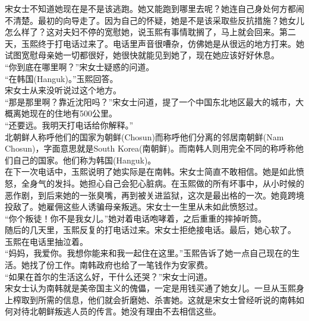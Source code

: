 宋女士不知道她现在是不是该逃跑。她又能跑到哪里去呢？她连自己身处何方都闹不清楚。最初的向导走了。因为自己的怀疑，她是不是该采取些反抗措施？她女儿怎么样了？这对夫妇不停的宽慰她，说玉熙有事情耽搁了，马上就会回来。第二天，玉熙终于打电话过来了。电话里声音很嘈杂，仿佛她是从很远的地方打来。她试图宽慰母亲她一切都很好，她很快就能见到她了，现在她应该好好休息。\\

“你到底在哪里啊？”宋女士疑惑的问道。\\

“在韩国(Hanguk)。”玉熙回答。\\

宋女士从来没听说过这个地方。\\

“那是那里啊？靠近沈阳吗？”宋女士问道，提了一个中国东北地区最大的城市，大概离她现在的住地有500公里。\\

“还要远。我明天打电话给你解释。”\\

北朝鲜人称呼他们的国家为朝鲜(Chosun)而称呼他们分离的邻居南朝鲜(Nam Chosun)，字面意思就是South Korea(南朝鲜)。而南韩人则用完全不同的称呼称他们自己的国家。他们称为韩国(Hanguk)。\\

在下一次电话中，玉熙说明了她实际是在南韩。宋女士简直不敢相信。她是如此愤怒，全身气的发抖。她担心自己会犯心脏病。在玉熙做的所有坏事中，从小时候的恶作剧，到后来她的一张臭嘴，再到被关进监狱，这次是最出格的一次。她竟跨境投敌了。她雇佣这些人诱骗母亲叛逃。宋女士一生里从未如此愤怒过。\\

“你个叛徒！你不是我女儿。”她对着电话咆哮着，之后重重的摔掉听筒。\\

随后的几天里，玉熙反复的打电话过来。宋女士拒绝接电话。最后，她心软了。\\

玉熙在电话里抽泣着。\\

“妈妈，我爱你。我想你能来和我一起住在这里。”玉熙告诉了她一点自己现在的生活。她找了份工作。南韩政府也给了一笔钱作为安家费。\\

“如果在首尔的生活这么好，干什么还哭？”宋女士问道。\\

宋女士认为南韩就是美帝国主义的傀儡，一定是用钱买通了她女儿。一旦从玉熙身上榨取到所需的信息，他们就会折磨她、杀害她。这就是宋女士曾经听说的南韩如何对待北朝鲜叛逃人员的传言。她没有理由不去相信这些。\\

